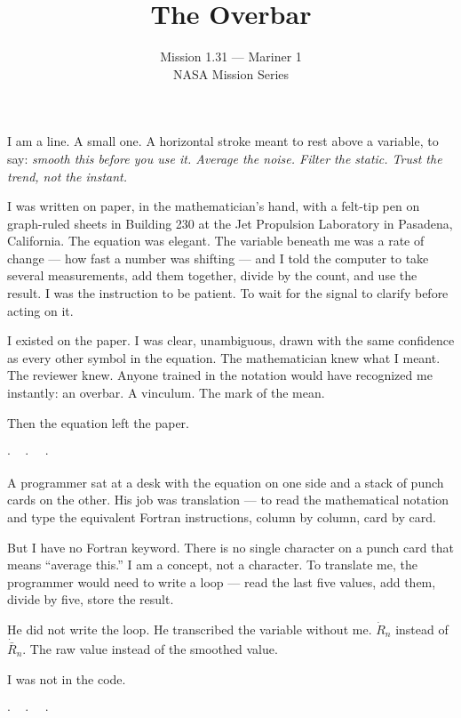 \documentclass[12pt]{article}
\title{The Overbar}
\author{Mission 1.31 --- Mariner 1\\NASA Mission Series}
\date{}
\begin{document}
\maketitle
\thispagestyle{empty}

\noindent I am a line. A small one. A horizontal stroke meant to rest above a variable, to say: \textit{smooth this before you use it. Average the noise. Filter the static. Trust the trend, not the instant.}

I was written on paper, in the mathematician's hand, with a felt-tip pen on graph-ruled sheets in Building 230 at the Jet Propulsion Laboratory in Pasadena, California. The equation was elegant. The variable beneath me was a rate of change --- how fast a number was shifting --- and I told the computer to take several measurements, add them together, divide by the count, and use the result. I was the instruction to be patient. To wait for the signal to clarify before acting on it.

I existed on the paper. I was clear, unambiguous, drawn with the same confidence as every other symbol in the equation. The mathematician knew what I meant. The reviewer knew. Anyone trained in the notation would have recognized me instantly: an overbar. A vinculum. The mark of the mean.

Then the equation left the paper.

\begin{center}
$\cdot\quad\cdot\quad\cdot$
\end{center}

A programmer sat at a desk with the equation on one side and a stack of punch cards on the other. His job was translation --- to read the mathematical notation and type the equivalent Fortran instructions, column by column, card by card.

But I have no Fortran keyword. There is no single character on a punch card that means ``average this.'' I am a concept, not a character. To translate me, the programmer would need to write a loop --- read the last five values, add them, divide by five, store the result.

He did not write the loop. He transcribed the variable without me. $\dot{R}_n$ instead of $\dot{\bar{R}}_n$. The raw value instead of the smoothed value.

I was not in the code.

\begin{center}
$\cdot\quad\cdot\quad\cdot$
\end{center}
\end{document}
